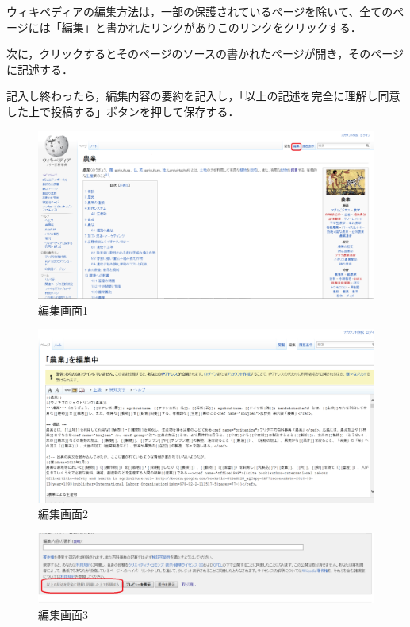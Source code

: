 ウィキペディアの編集方法は，一部の保護されているページを除いて、全てのページには「編集」と書かれたリンクがありこのリンクをクリックする．


次に，クリックするとそのページのソースの書かれたページが開き，そのページに記述する．

記入し終わったら，編集内容の要約を記入し，「以上の記述を完全に理解し同意した上で投稿する」ボタンを押して保存する．
\begin{figure}[htb]
\centering
\includegraphics[width=12cm]{mudai.png}
\caption{編集画面1}\label{図}
\end{figure}

\begin{figure}[htb]
\centering
\includegraphics[width=12cm]{2.png}
\caption{編集画面2}\label{図}
\end{figure}

\begin{figure}[htb]
\centering
\includegraphics[width=12cm]{3.png}
\caption{編集画面3}\label{図}
\end{figure}

